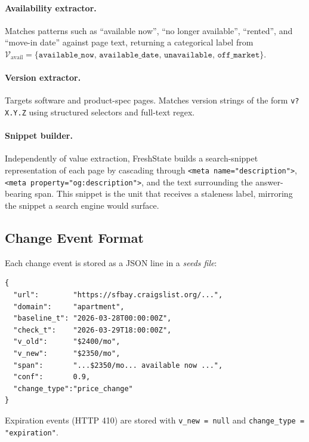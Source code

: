 \paragraph{Availability extractor.}
Matches patterns such as ``available now'', ``no longer available'', ``rented'',
and ``move-in date'' against page text, returning a categorical label from
$\mathcal{V}_{\text{avail}} = \{\texttt{available\_now},\, \texttt{available\_date},\,
\texttt{unavailable},\, \texttt{off\_market}\}$.

\paragraph{Version extractor.}
Targets software and product-spec pages. Matches version strings of the form
\texttt{v?X.Y.Z} using structured selectors and full-text regex.

\paragraph{Snippet builder.}
Independently of value extraction, FreshState builds a search-snippet representation
of each page by cascading through \texttt{<meta name="description">},
\texttt{<meta property="og:description">}, and the text surrounding the
answer-bearing span. This snippet is the unit that receives a staleness label,
mirroring the snippet a search engine would surface.

\subsection{Change Event Format}

Each change event is stored as a JSON line in a \emph{seeds file}:
\begin{verbatim}
{
  "url":        "https://sfbay.craigslist.org/...",
  "domain":     "apartment",
  "baseline_t": "2026-03-28T00:00:00Z",
  "check_t":    "2026-03-29T18:00:00Z",
  "v_old":      "$2400/mo",
  "v_new":      "$2350/mo",
  "span":       "...$2350/mo... available now ...",
  "conf":       0.9,
  "change_type":"price_change"
}
\end{verbatim}
Expiration events (HTTP 410) are stored with \texttt{v\_new = null} and
\texttt{change\_type = "expiration"}.
